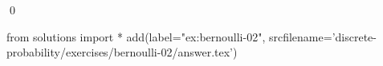 
\begin{ex} 
  \label{ex:bernoulli-02}
  
  \qed
\end{ex} 
\begin{python0}
from solutions import *
add(label="ex:bernoulli-02",
    srcfilename='discrete-probability/exercises/bernoulli-02/answer.tex') 
\end{python0}
